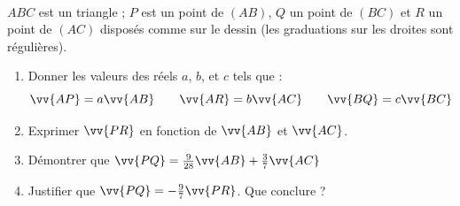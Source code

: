 \documentclass[main.tex]{subfiles}
\begin{document}
%
\begin{exercise} \hfill\\	
$ABC$ est un triangle ; $P$ est un point de $(AB)$, $Q$ un point de $(BC)$ et $R$ un point de $(AC)$ disposés comme sur le dessin (les graduations sur les droites sont régulières). \\
\begin{minipage}{0.5\columnwidth}
\begin{enumerate}
\item Donner les valeurs des réels $a$, $b$, et $c$ tels que :
\[
\vv{AP}=a\vv{AB}\qquad \vv{AR}=b\vv{AC}\qquad\vv{BQ}=c\vv{BC} 
\]  
\item Exprimer $\vv{PR}$ en fonction de $\vv{AB}$ et $\vv{AC}$.
\item Démontrer que $\vv{PQ}=\frac{9}{28}\vv{AB}+\frac{3}{7}\vv{AC}$
\item Justifier que $\vv{PQ}=-\frac{9}{7}\vv{PR}$. Que conclure ?
\end{enumerate} 
\end{minipage}
\begin{minipage}{0.5\columnwidth}\centering
{}
\end{minipage}

\end{exercise}



%	 
\cleardoublepage 
%	
\end{document}
